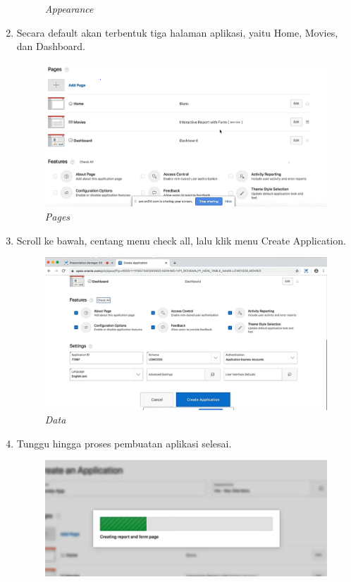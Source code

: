 \begin{enumerate}
\begin{figure}[H]
    \caption{\textit{Appearance}}
    \label{Data}
\end{figure}
 \item Secara default akan terbentuk tiga halaman aplikasi, yaitu Home, Movies, dan Dashboard.
 \begin{figure}[H]
    \centering
    \includegraphics[scale=0.5]{figures/16}
    \caption{\textit{Pages}}
    \label{Page}
\end{figure}
 \item Scroll ke bawah, centang menu check all, lalu klik menu Create Application.
 \begin{figure}[H]
    \centering
    \includegraphics[scale=0.5]{figures/17}
    \caption{\textit{Data}}
    \label{CheckAll}
\end{figure}
\item Tunggu hingga proses pembuatan aplikasi selesai.
 \begin{figure}[H]
    \centering
    \includegraphics[scale=0.5]{figures/18}

\end{figure}
\end{enumerate}

